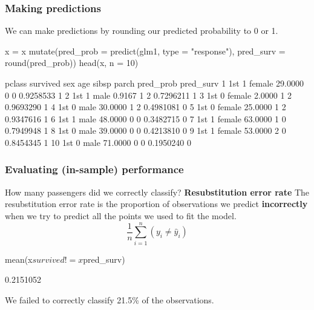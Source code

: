 \documentclass[a4paper]{article}\usepackage[]{graphicx}\usepackage[]{xcolor}
\begin{document}
\subsubsection{Making predictions}
We can make predictions by rounding our predicted probability to 0 or 1.
\begin{Schunk}
\begin{Sinput}
x = x %
  mutate(pred_prob = predict(glm1, type = "response"),
         pred_surv = round(pred_prob))
head(x, n = 10)
\end{Sinput}
\begin{Soutput}
   pclass survived    sex     age sibsp parch pred_prob pred_surv
1     1st        1 female 29.0000     0     0 0.9258533         1
2     1st        1   male  0.9167     1     2 0.7296211         1
3     1st        0 female  2.0000     1     2 0.9693290         1
4     1st        0   male 30.0000     1     2 0.4981081         0
5     1st        0 female 25.0000     1     2 0.9347616         1
6     1st        1   male 48.0000     0     0 0.3482715         0
7     1st        1 female 63.0000     1     0 0.7949948         1
8     1st        0   male 39.0000     0     0 0.4213810         0
9     1st        1 female 53.0000     2     0 0.8454345         1
10    1st        0   male 71.0000     0     0 0.1950240         0
\end{Soutput}
\end{Schunk}
\subsubsection{Evaluating (in-sample) performance}
How many passengers did we correctly classify?
\textbf{Resubstitution error rate}
The \textcolor{myblue}{resubstitution error rate} is the proportion of observations we predict \textcolor{myblue}{\textbf{incorrectly}} when we try to predict all the points we used to fit the model.
\[
	\frac{1}{n}\sum_{i=1}^n (y_i \neq \hat{y}_i)
\]
\begin{Schunk}
\begin{Sinput}
mean(x$survived != x$pred_surv)
\end{Sinput}
\begin{Soutput}
[1] 0.2151052
\end{Soutput}
\end{Schunk}
We failed to correctly classify 21.5\% of the observations.
\end{document}
